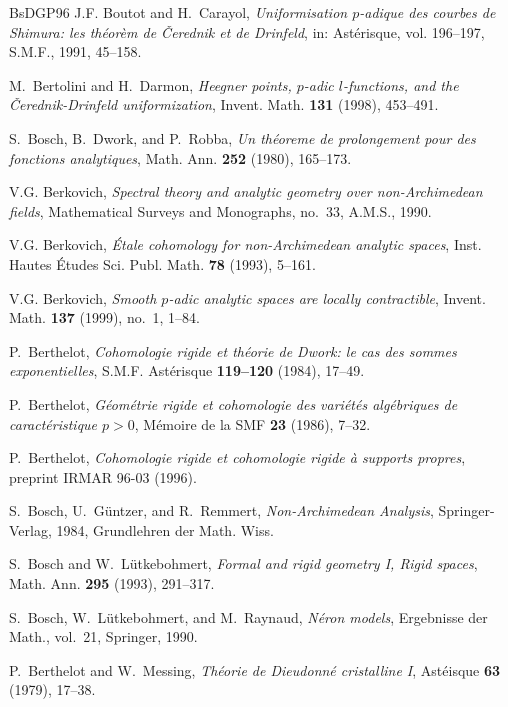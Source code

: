 \begin{thebibliography}{BsDGP96}
J.F. Boutot and H.~Carayol, \emph{Uniformisation $p$-adique des courbes de
  {S}himura: les th\'eor\`em de \v{C}erednik et de Drinfeld}, in: Ast\'erisque,
  vol. 196--197, S.M.F., 1991, 45--158.

M.~Bertolini and H.~Darmon, \emph{Heegner points, $p$-adic $l$-functions, and
  the \v{C}erednik-Drinfeld uniformization}, Invent. Math. \textbf{131} (1998),
  453--491.

S.~Bosch, B.~Dwork, and P.~Robba, \emph{Un th\'eoreme de prolongement pour des
  fonctions analytiques}, Math. Ann. \textbf{252} (1980), 165--173.

V.G. Berkovich, \emph{Spectral theory and analytic geometry over
  non-{A}rchimedean fields}, Mathematical Surveys and Monographs, no.~33,
  A.M.S., 1990.

V.G. Berkovich, \emph{\'{E}tale cohomology for non-{A}rchimedean analytic
  spaces}, Inst. Hautes {\'E}tudes Sci. Publ. Math. \textbf{78} (1993), 5--161.

V.G. Berkovich, \emph{Smooth $p$-adic analytic spaces are locally
  contractible}, Invent. Math. \textbf{137} (1999), no.~1, 1--84.

P.~Berthelot, \emph{Cohomologie rigide et th\'eorie de Dwork: le cas des sommes
  exponentielles}, S.M.F. Ast\'erisque \textbf{119--120} (1984), 17--49.

P.~Berthelot, \emph{G\'eom\'etrie rigide et cohomologie des vari\'et\'es
  alg\'ebriques de caract\'eristique $p>0$}, M\'emoire de la SMF \textbf{23}
  (1986), 7--32.

P.~Berthelot, \emph{Cohomologie rigide et cohomologie rigide \`a supports
  propres}, preprint IRMAR 96-03 (1996).

S.~Bosch, U.~G{\"u}ntzer, and R.~Remmert, \emph{Non-{A}rchimedean {A}nalysis},
  Springer-Verlag, 1984, Grundlehren der Math. Wiss.

S.~Bosch and W.~L{\"u}tkebohmert, \emph{Formal and rigid geometry {I}, {R}igid
  spaces}, Math. Ann. \textbf{295} (1993), 291--317.

S.~Bosch, W.~L{\"u}tkebohmert, and M.~Raynaud, \emph{N\'eron models},
  Ergebnisse der Math., vol.~21, Springer, 1990.

P.~Berthelot and W.~Messing, \emph{Th\'eorie de {D}ieudonn\'e cristalline {I}},
  Ast\'eisque \textbf{63} (1979), 17--38.


\end{thebibliography}
